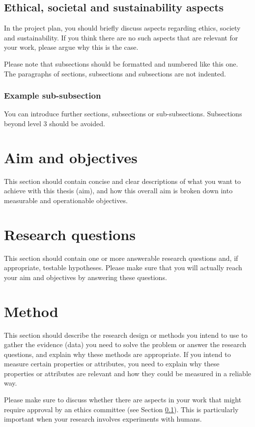 \documentclass[12pt,a4paper,twoside]{article}
\begin{document}
\subsection{Ethical, societal and sustainability aspects}
\label{sec:ethics}
In the project plan, you should briefly discuss aspects regarding ethics, society and sustainability. If you think there are no such aspects that are relevant for
your work, please argue why this is the case.

Please note that subsections should be formatted and numbered like this one.
The paragraphs of sections, subsections and subsections are not indented.


\subsubsection{Example sub-subsection}
You can introduce further sections, subsections or sub-subsections. Subsections beyond level 3 should be avoided. 


\section{Aim and objectives}
\label{sec:aim}
This section should contain concise and clear descriptions of what you want to achieve with this thesis (aim), and how this overall aim is broken down into measurable and operationable objectives. 

\section{Research questions}
\label{sec:rq}
This section should contain one or more answerable research questions and, if appropriate, testable hypotheses. Please make sure that you will actually reach your aim and objectives by answering these questions.

\section{Method}
\label{sec:method}
This section should describe the research design or methods you intend to use to gather the evidence (data) you need to solve the problem or answer the research questions, and explain why these
methods are appropriate. If you intend to measure certain properties or attributes, you
need to explain why these properties or attributes are relevant and how they could be measured
in a reliable way.

Please make sure to discuss whether there are aspects in your work that might require
approval by an ethics committee (see Section \ref{sec:ethics}). This is particularly important
when your research involves experiments with humans.
\end{document}
